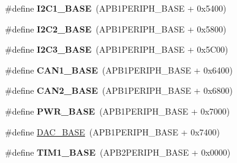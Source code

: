 \begin{DoxyCompactItemize}
\item 
\hypertarget{group___peripheral__memory__map_gacd72dbffb1738ca87c838545c4eb85a3}{\#define {\bfseries I2\-C1\-\_\-\-B\-A\-S\-E}~(A\-P\-B1\-P\-E\-R\-I\-P\-H\-\_\-\-B\-A\-S\-E + 0x5400)}\label{group___peripheral__memory__map_gacd72dbffb1738ca87c838545c4eb85a3}

\item 
\hypertarget{group___peripheral__memory__map_ga04bda70f25c795fb79f163b633ad4a5d}{\#define {\bfseries I2\-C2\-\_\-\-B\-A\-S\-E}~(A\-P\-B1\-P\-E\-R\-I\-P\-H\-\_\-\-B\-A\-S\-E + 0x5800)}\label{group___peripheral__memory__map_ga04bda70f25c795fb79f163b633ad4a5d}

\item 
\hypertarget{group___peripheral__memory__map_ga4e8b9198748235a1729e1e8f8f24983b}{\#define {\bfseries I2\-C3\-\_\-\-B\-A\-S\-E}~(A\-P\-B1\-P\-E\-R\-I\-P\-H\-\_\-\-B\-A\-S\-E + 0x5\-C00)}\label{group___peripheral__memory__map_ga4e8b9198748235a1729e1e8f8f24983b}

\item 
\hypertarget{group___peripheral__memory__map_gad8e45ea6c032d9fce1b0516fff9d8eaa}{\#define {\bfseries C\-A\-N1\-\_\-\-B\-A\-S\-E}~(A\-P\-B1\-P\-E\-R\-I\-P\-H\-\_\-\-B\-A\-S\-E + 0x6400)}\label{group___peripheral__memory__map_gad8e45ea6c032d9fce1b0516fff9d8eaa}

\item 
\hypertarget{group___peripheral__memory__map_gaf7b8267b0d439f8f3e82f86be4b9fba1}{\#define {\bfseries C\-A\-N2\-\_\-\-B\-A\-S\-E}~(A\-P\-B1\-P\-E\-R\-I\-P\-H\-\_\-\-B\-A\-S\-E + 0x6800)}\label{group___peripheral__memory__map_gaf7b8267b0d439f8f3e82f86be4b9fba1}

\item 
\hypertarget{group___peripheral__memory__map_gac691ec23dace8b7a649a25acb110217a}{\#define {\bfseries P\-W\-R\-\_\-\-B\-A\-S\-E}~(A\-P\-B1\-P\-E\-R\-I\-P\-H\-\_\-\-B\-A\-S\-E + 0x7000)}\label{group___peripheral__memory__map_gac691ec23dace8b7a649a25acb110217a}

\item 
\#define \hyperlink{group___peripheral__memory__map_gad18d0b914c7f68cecbee1a2d23a67d38}{D\-A\-C\-\_\-\-B\-A\-S\-E}~(A\-P\-B1\-P\-E\-R\-I\-P\-H\-\_\-\-B\-A\-S\-E + 0x7400)
\item 
\hypertarget{group___peripheral__memory__map_gaf8aa324ca5011b8173ab16585ed7324a}{\#define {\bfseries T\-I\-M1\-\_\-\-B\-A\-S\-E}~(A\-P\-B2\-P\-E\-R\-I\-P\-H\-\_\-\-B\-A\-S\-E + 0x0000)}\label{group___peripheral__memory__map_gaf8aa324ca5011b8173ab16585ed7324a}


\end{DoxyCompactItemize}
